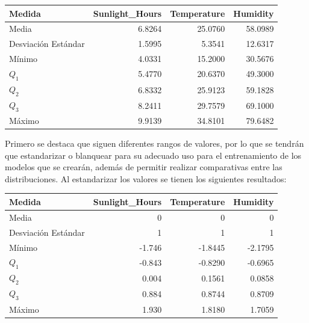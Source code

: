 \documentclass[12pt,a4paper]{article}
\begin{document}
{{            \begin{center}
                \begin{tabular}{lrrr}
                \toprule
                    Medida & Sunlight\_Hours & Temperature & Humidity \\
                \midrule
                    Media               & 6.8264 & 25.0760 & 58.0989 \\
                    Desviación Estándar & 1.5995 &  5.3541 & 12.6317 \\
                    Mínimo              & 4.0331 & 15.2000 & 30.5676 \\
                    $Q_1$               & 5.4770 & 20.6370 & 49.3000 \\
                    $Q_2$               & 6.8332 & 25.9123 & 59.1828 \\
                    $Q_3$               & 8.2411 & 29.7579 & 69.1000 \\
                    Máximo              & 9.9139 & 34.8101 & 79.6482 \\
                \bottomrule
                \end{tabular}
            \end{center}

            Primero se destaca que siguen diferentes rangos de valores, por lo que se 
            tendrán que estandarizar o blanquear para su adecuado uso para el entrenamiento 
            de los modelos que se crearán, además de permitir realizar comparativas entre 
            las distribuciones. Al estandarizar los valores se tienen los siguientes resultados:

            \begin{center}
                \begin{tabular}{lrrr}
                \toprule
                Medida & Sunlight\_Hours & Temperature & Humidity \\
                \midrule
                Media               & 0 & 0 & 0 \\
                Desviación Estándar & 1 & 1 & 1 \\
                Mínimo              & -1.746 & -1.8445 & -2.1795 \\
                $Q_1$               & -0.843 & -0.8290 & -0.6965 \\
                $Q_2$               &  0.004 &  0.1561 &  0.0858 \\
                $Q_3$               &  0.884 &  0.8744 &  0.8709 \\
                Máximo              &  1.930 &  1.8180 &  1.7059 \\
                \bottomrule
                \end{tabular}
            \end{center}

}}
\end{document}

